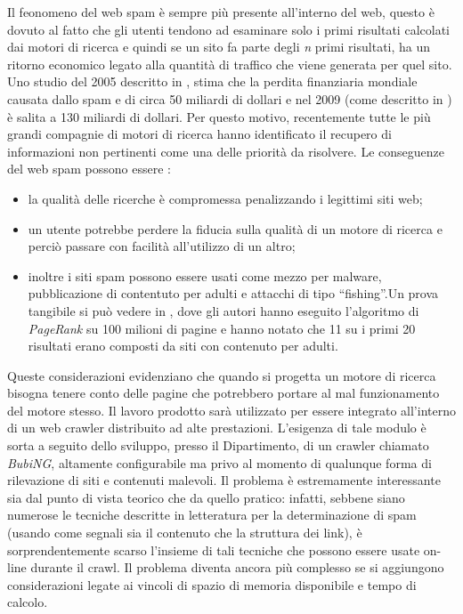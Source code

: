 Il feonomeno del web spam è sempre più presente all'interno del web, questo è dovuto al fatto che gli utenti tendono ad esaminare solo i primi risultati calcolati dai motori di ricerca e quindi se un sito fa parte degli \textit{n} primi risultati, ha un ritorno economico legato alla quantità di traffico che viene generata per quel sito. Uno studio  del 2005 descritto in \cite{Nicholas:2005}, stima che la perdita finanziaria mondiale causata dallo spam e di circa 50 miliardi di dollari e nel 2009 (come descritto in \cite{Nicholas:2009}) è salita a 130 miliardi di dollari. Per questo motivo, recentemente tutte le più grandi compagnie di motori di ricerca hanno identificato il recupero di informazioni non pertinenti come una delle priorità da risolvere. Le conseguenze del web spam possono essere \cite{Spirin:2012:SWS:2207243.2207252}:
\begin{itemize}
 \item la qualità delle ricerche è compromessa penalizzando i legittimi siti web;
 \item un utente potrebbe perdere la fiducia sulla qualità di un motore di ricerca e perciò passare con facilità all'utilizzo di un altro;
 \item inoltre i siti spam possono essere usati come mezzo per malware, pubblicazione di contentuto per adulti e attacchi di tipo ``fishing''.Un prova tangibile si può vedere in \cite{Eiron:2004:RWF:988672.988714}, dove gli autori hanno eseguito l'algoritmo di \textit{PageRank} su 100 milioni di pagine e hanno notato che 11 su i primi 20 risultati erano composti da siti con contenuto per adulti.
\end{itemize}
Queste considerazioni evidenziano che quando si progetta un motore di ricerca bisogna tenere conto delle pagine che potrebbero portare al mal funzionamento del motore stesso.
Il lavoro prodotto sarà utilizzato per essere integrato	all'interno di un web crawler distribuito ad alte prestazioni. L'esigenza di tale modulo è sorta a seguito dello sviluppo, presso il Dipartimento, di un crawler chiamato {\itshape BubiNG}, altamente configurabile ma privo al momento di qualunque forma di rilevazione di siti e contenuti malevoli. Il problema è estremamente interessante sia dal punto di vista teorico che da quello pratico: infatti, sebbene
siano numerose le tecniche descritte in letteratura per la determinazione di spam (usando come segnali sia il contenuto che la struttura dei link), è sorprendentemente scarso l'insieme di tali tecniche che possono essere usate on-line durante il crawl. Il problema diventa ancora più complesso se si aggiungono considerazioni legate ai vincoli di spazio di memoria disponibile e tempo di calcolo.
